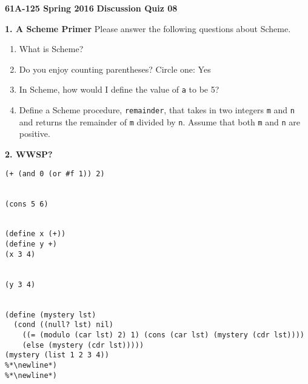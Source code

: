 \documentclass[11pt]{article}
\begin{document}
\textbf{61A-125 Spring 2016}\newline
\textbf{Discussion Quiz 08}\newline

\textbf{1. A Scheme Primer}\newline
Please answer the following questions about Scheme.

\begin{enumerate}[leftmargin=0.63cm,itemindent=0cm,labelwidth=\itemindent,label=(\alph*)]
\item What is Scheme?
\newline\newline\newline

\item Do you enjoy counting parentheses? Circle one: Yes

\item In Scheme, how would I define the value of \texttt{a} to be 5?
\newline\newline\newline

\item Define a Scheme procedure, \texttt{remainder}, that takes in two integers \texttt{m} and \texttt{n} and returns the remainder of \texttt{m} divided by \texttt{n}. Assume that both \texttt{m} and \texttt{n} are positive.\newline
\end{enumerate}
\vspace{\fill}

\textbf{2. WWSP?}
\begin{lstlisting}
(+ (and 0 (or #f 1)) 2)


(cons 5 6)


(define x (+))
(define y +)
(x 3 4)


(y 3 4)


(define (mystery lst)
  (cond ((null? lst) nil)
    ((= (modulo (car lst) 2) 1) (cons (car lst) (mystery (cdr lst))))
    (else (mystery (cdr lst)))))
(mystery (list 1 2 3 4))
%*\newline*)
%*\newline*)
\end{lstlisting}
\end{document}
